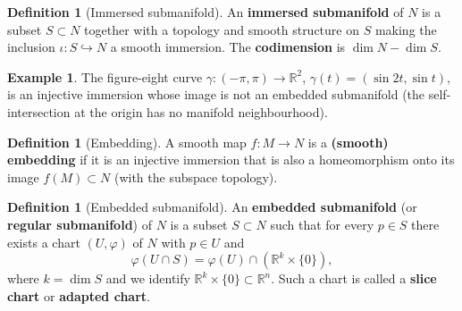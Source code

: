 \documentclass[12pt,a4paper,openany]{book}
\theoremstyle{definition}
\newtheorem{definition}[theorem]{Definition}
\newtheorem{example}[theorem]{Example}
\theoremstyle{remark}
\newcommand{\R}{\mathbb{R}}
\begin{document}
\begin{definition}[Immersed submanifold]\label{def:immersed-submanifold}%
An \textbf{immersed submanifold} of $N$ is a subset $S \subset N$
together with a topology and smooth structure on $S$ making the
inclusion $\iota \colon S \hookrightarrow N$ a smooth immersion.
The \textbf{codimension} is $\dim N - \dim S$.
\end{definition}

\begin{example}\label{ex:figure-eight}%
The figure-eight curve $\gamma \colon (-\pi, \pi) \to \R^2$,
$\gamma(t) = (\sin 2t, \sin t)$, is an injective immersion whose image
is not an embedded submanifold (the self-intersection at the origin has
no manifold neighbourhood).
\end{example}

\begin{center}
\end{center}

\begin{definition}[Embedding]\label{def:embedding}%
A smooth map $f \colon M \to N$ is a \textbf{(smooth) embedding} if it
is an injective immersion that is also a homeomorphism onto its image
$f(M) \subset N$ (with the subspace topology).
\end{definition}

\begin{definition}[Embedded submanifold]\label{def:embedded-submanifold}%
An \textbf{embedded submanifold} (or \textbf{regular submanifold}) of $N$
is a subset $S \subset N$ such that for every $p \in S$ there exists a
chart $(U, \varphi)$ of $N$ with $p \in U$ and
\[
  \varphi(U \cap S) = \varphi(U) \cap (\R^k \times \{0\}),
\]
where $k = \dim S$ and we identify $\R^k \times \{0\} \subset \R^n$.
Such a chart is called a \textbf{slice chart} or
\textbf{adapted chart}.
\end{definition}
\end{document}
